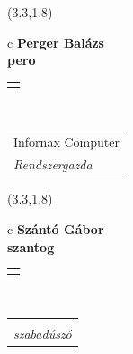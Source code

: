 \documentclass[11pt]{article}
\begin{document}
\makebox(3.3,1.8){
  \renewcommand\arraystretch{1.3}
  \begin{tabular}[c]{c}
    \hspace{8.5mm}
    \LARGE\bf{ Perger Balázs }\\
    \hspace{8.5mm}
    \Large{ pero }\\
    \renewcommand\arraystretch{3}
    \begin{tabular}[c]{c}
      \centering
      \fontfamily{phv}\selectfont{
        \textbf{
          \textsc{
            \scriptsize{
            \color{Bright}{ Ismerkedő }\color{Dark}{ Webmester }\color{Bright}{ Sminkmester }\color{Bright}{ Programozó }
            }
          }
        }
      }
    \end{tabular}
    \\
    \renewcommand\arraystretch{1}
    \begin{tabular}{p{3.3in}}
      \hspace{.7cm}Infornax Computer\\
      \hspace{.7cm}\emph{ Rendszergazda }\\
    \end{tabular}
  \end{tabular}
}

\makebox(3.3,1.8){
  \renewcommand\arraystretch{1.3}
  \begin{tabular}[c]{c}
    \hspace{8.5mm}
    \LARGE\bf{ Szántó Gábor }\\
    \hspace{8.5mm}
    \Large{ szantog }\\
    \renewcommand\arraystretch{3}
    \begin{tabular}[c]{c}
      \centering
      \fontfamily{phv}\selectfont{
        \textbf{
          \textsc{
            \scriptsize{
            \color{Bright}{ Ismerkedő }\color{Dark}{ Webmester }\color{Dark}{ Sminkmester }\color{Bright}{ Programozó }
            }
          }
        }
      }
    \end{tabular}
    \\
    \renewcommand\arraystretch{1}
    \begin{tabular}{p{3.3in}}
      \hspace{.7cm}\\
      \hspace{.7cm}\emph{ szabadúszó }\\
    \end{tabular}
  \end{tabular}
}
\end{document}
